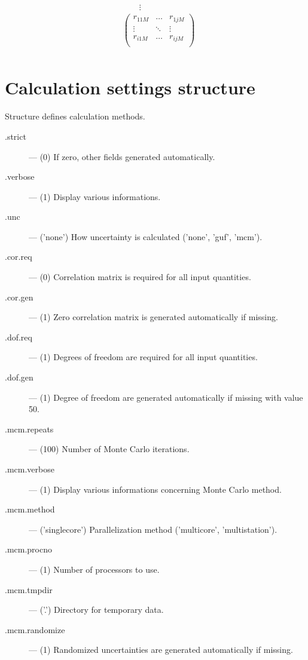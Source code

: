 \documentclass[12pt]{article} %
\begin{document}
\begin{eqnarray*}
                            & \qquad\vdots                        \\
                            & \left(    \begin{array}{ccc}
                                                r_{11M}  & \hdots & r_{1jM} \\
                                                \vdots  & \ddots & \vdots \\
                                                r_{i1M}  & \hdots & r_{ijM} \\
                                        \end{array}\right) \\
\end{eqnarray*}

\section{Calculation settings structure} %
\label{structcalcset}
Structure defines calculation methods.
\begin{description}
        \item [\textsf{.strict}] ---  (0) If zero, other fields generated automatically.
        \item [\textsf{.verbose}] ---  (1) Display various informations.
        \item [\textsf{.unc}] ---  ('none') How uncertainty is calculated ('none', 'guf', 'mcm').
        \item [\textsf{.cor.req}] ---  (0) Correlation matrix is required for all input quantities.
        \item [\textsf{.cor.gen}] ---  (1) Zero correlation matrix is generated automatically if missing.
        \item [\textsf{.dof.req}] ---  (1) Degrees of freedom are required for all input quantities.
        \item [\textsf{.dof.gen}] ---  (1) Degree of freedom are generated automatically if missing with value 50.
        \item [\textsf{.mcm.repeats}] ---  (100) Number of Monte Carlo iterations.
        \item [\textsf{.mcm.verbose}] ---  (1) Display various informations concerning Monte Carlo method.
        \item [\textsf{.mcm.method}] ---  ('singlecore') Parallelization method ('multicore', 'multistation').
        \item [\textsf{.mcm.procno}] ---  (1) Number of processors to use.
        \item [\textsf{.mcm.tmpdir}] ---  ('.') Directory for temporary data.
        \item [\textsf{.mcm.randomize}] ---  (1) Randomized uncertainties are generated automatically if missing.
\end{description}
\end{document}
